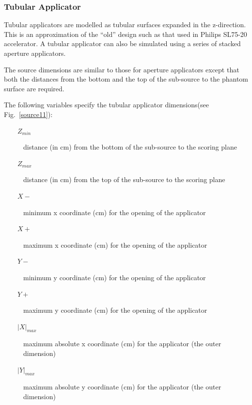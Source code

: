 \documentclass[12pt,twoside]{article}
\begin{document}
\subsubsection{Tubular Applicator}
Tubular applicators are modelled as tubular surfaces expanded in the z-direction. This is an approximation of  the ``old'' design such as that used in Philips SL75-20 accelerator. A tubular applicator can also be simulated using a series of stacked aperture applicators.

The source dimensions are similar to those for aperture applicators except that both the distances from the bottom and the top of the sub-source to the phantom surface are required.

The following variables specify the tubular applicator dimensions(see Fig.~\ref{source11}):


\begin{description}
\item [~~~~$Z_{min}$] distance (in cm) from the bottom of the sub-source to the scoring plane
\item [~~~~$Z_{max}$] distance (in cm) from the top of the sub-source to the scoring plane
\item [~~~~$X-$] minimum x coordinate (cm) for the opening of the applicator
\item [~~~~$X+$] maximum x coordinate (cm) for the opening of the applicator
\item [~~~~$Y-$] minimum y coordinate (cm) for the opening of the applicator
\item [~~~~$Y+$] maximum y coordinate (cm) for the opening of the applicator
\item [~~~~$|X|_{max}$] maximum absolute x coordinate (cm) for the applicator (the outer dimension)
\item [~~~~$|Y|_{max}$] maximum absolute y coordinate (cm) for the applicator (the outer dimension)
\end{description}
\end{document}
